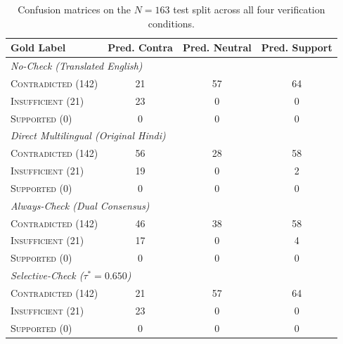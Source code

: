 \begin{table}[t]
\centering
\small
\begin{tabular}{lccc}
\toprule
\textbf{Gold Label} & \textbf{Pred. Contra} & \textbf{Pred. Neutral} & \textbf{Pred. Support} \\
\midrule
\multicolumn{4}{l}{\textit{No-Check (Translated English)}} \\
\textsc{Contradicted} (142) & 21 & 57 & 64 \\
\textsc{Insufficient} (21) & 23 & 0 & 0 \\
\textsc{Supported} (0) & 0 & 0 & 0 \\
\midrule
\multicolumn{4}{l}{\textit{Direct Multilingual (Original Hindi)}} \\
\textsc{Contradicted} (142) & 56 & 28 & 58 \\
\textsc{Insufficient} (21) & 19 & 0 & 2 \\
\textsc{Supported} (0) & 0 & 0 & 0 \\
\midrule
\multicolumn{4}{l}{\textit{Always-Check (Dual Consensus)}} \\
\textsc{Contradicted} (142) & 46 & 38 & 58 \\
\textsc{Insufficient} (21) & 17 & 0 & 4 \\
\textsc{Supported} (0) & 0 & 0 & 0 \\
\midrule
\multicolumn{4}{l}{\textit{Selective-Check ($\tau^*=0.650$)}} \\
\textsc{Contradicted} (142) & 21 & 57 & 64 \\
\textsc{Insufficient} (21) & 23 & 0 & 0 \\
\textsc{Supported} (0) & 0 & 0 & 0 \\
\bottomrule
\end{tabular}
\caption{Confusion matrices on the $N=163$ test split across all four verification conditions.}
\label{tab:app_confusion_matrices}
\end{table}

